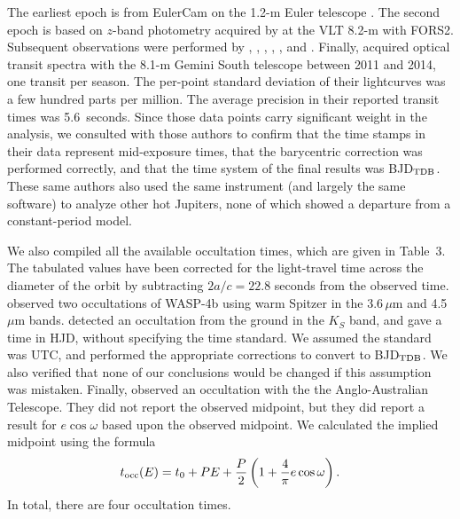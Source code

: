 \documentclass[12pt,twocolumn,tighten]{aastex62}
\begin{document}
The earliest epoch is from EulerCam on the 1.2-m Euler telescope
\citep{wilson_wasp-4b_2008}.  The second epoch is based on $z$-band
photometry acquired by \citet{gillon_improved_2009} at the VLT 8.2-m
with FORS2.  Subsequent observations were performed by
\citet{winn_transit_2009}, \citet{dragomir_terms_2011},
\citet{sanchis-ojeda_starspots_2011}, \citet{nikolov_wasp-4b_2012},
\citet{hoyer_tramos_2013}, and \citet{ranjan_atmospheric_2014}.
Finally, \citet{huitson_gemini_2017} acquired optical transit spectra
with the 8.1-m Gemini South telescope between 2011 and 2014, one
transit per season.  The per-point standard deviation of their
lightcurves was a few hundred parts per million.  The average
precision in their reported transit times was 5.6~seconds.  Since
those data points carry significant weight in the analysis, we
consulted with those authors to confirm that the time stamps in their
data represent mid-exposure times, that the barycentric correction was
performed correctly, and that the time system of the final results was
BJD$_{\rm TDB}$.  These same authors also used the same instrument
(and largely the same software) to analyze other hot Jupiters, none of
which showed a departure from a constant-period model.

We also compiled all the available occultation times, which are given
in Table~3.  The tabulated values have been corrected for the
light-travel time across the diameter of the orbit by subtracting
$2a/c = 22.8$ seconds from the observed time.
\citet{beerer_secondary_2011} observed two occultations of WASP-4b
using warm Spitzer in the 3.6\,$\mu$m and 4.5\,$\mu$m bands.
\citet{caceres_ground-based_2011} detected an occultation from the
ground in the $K_S$ band, and gave a time in HJD, without specifying
the time standard.  We assumed the standard was UTC, and performed the
appropriate corrections to convert to BJD$_{\rm TDB}$.  We
also verified that none of our conclusions would be changed if this
assumption was mistaken. Finally, \citet{zhou_secondary_2015} observed an
occultation with the the Anglo-Australian Telescope.  They did not
report the observed midpoint, but they did report a result for
$e\cos\omega$ based upon the observed midpoint.  We calculated the
implied midpoint using the formula \citep[{\it
e.g.},][]{winn_exoplanet_2010}
\begin{equation}
  t_{\rm occ}(E) =
  t_0 +  P E  +
  \frac{P}{2} \left( 1 + \frac{4}{\pi} e\cos\omega \right).
  \label{eq:occultation_time}
\end{equation}
In total, there are four occultation times.
\end{document}
